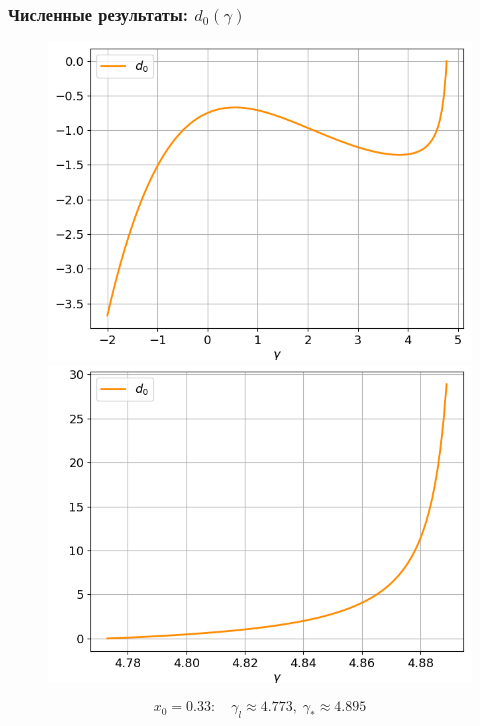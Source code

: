 \documentclass[fullscreen=true, unicode, bookmarks=false]{beamer}
\begin{document}
\begin{frame}
\frametitle{ Численные результаты: $ d_0(\gamma) $ }

\begin{figure} 
\includegraphics[scale=0.37]{divergent_d0_before_13.png}  
\hfill
\includegraphics[scale=0.37]{divergent_d0_after_13.png}  
\end{figure}

$$ x_0 = 0.33: \quad \gamma_l \approx 4.773, \; \gamma_* \approx 4.895 $$

\end{frame}
\end{document}
